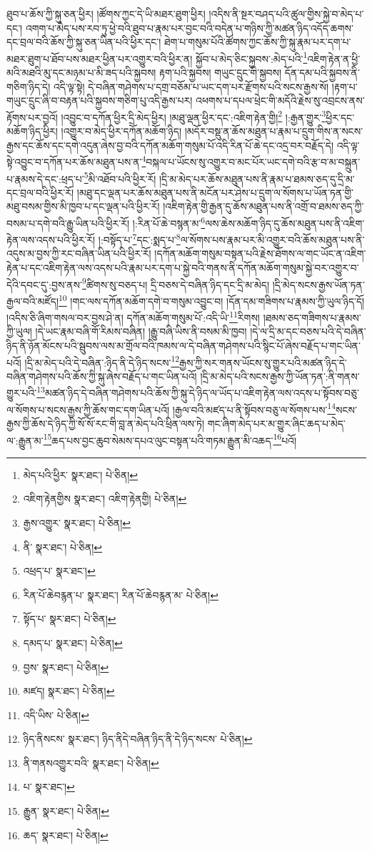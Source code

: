 ཐུབ་པ་ཆོས་ཀྱི་སྐུ་ཅན་ཕྱིར། །ཚོགས་ཀྱང་དེ་ཡི་མཐར་ཐུག་ཕྱིར། །འདིས་ནི་སྔར་བཤད་པའི་ཚུལ་གྱིས་སྐྱེ་བ་མེད་པ་དང་། འགག་པ་མེད་པས་རབ་ཏུ་ཕྱེ་བའི་ཐུབ་པ་རྣམ་པར་བྱང་བའི་བདེན་པ་གཉིས་ཀྱི་མཚན་ཉིད་འདོད་ཆགས་དང་བྲལ་བའི་ཆོས་ཀྱི་སྐུ་ཅན་ཡིན་པའི་ཕྱིར་དང་། ཐེག་པ་གསུམ་པོའི་ཚོགས་ཀྱང་ཆོས་ཀྱི་སྐུ་རྣམ་པར་དག་པ་མཐར་ཐུག་པ་ཐོབ་པས་མཐར་ཕྱིན་པར་འགྱུར་བའི་ཕྱིར་ན། སྐྱོབ་པ་མེད་ཅིང་སྐྱབས་:མེད་པའི་\footnote{མེད་པའི་ཕྱིར་  སྣར་ཐང་།  པེ་ཅིན། }འཇིག་རྟེན་ན་ཕྱི་མའི་མཐའི་མུ་དང་མཉམ་པ་མི་ཟད་པའི་སྐྱབས། རྟག་པའི་སྐྱབས། གཡུང་དྲུང་གི་སྐྱབས། དོན་དམ་པའི་སྐྱབས་ནི་གཅིག་ཉིད་དེ། འདི་ལྟ་སྟེ། དེ་བཞིན་གཤེགས་པ་དགྲ་བཅོམ་པ་ཡང་དག་པར་རྫོགས་པའི་སངས་རྒྱས་སོ། །རྟག་པ་གཡུང་དྲུང་ཞི་བ་བརྟན་པའི་སྐྱབས་གཅིག་པུ་འདི་རྒྱས་པར། འཕགས་པ་དཔལ་ཕྲེང་གི་མདོའི་རྗེས་སུ་འབྲངས་ནས་རྟོགས་པར་བྱའོ། །འབྱུང་བ་དཀོན་ཕྱིར་དྲི་མེད་ཕྱིར། །མཐུ་ལྡན་ཕྱིར་དང་:འཇིག་རྟེན་གྱི།\footnote{འཇིག་རྟེནགྱིས  སྣར་ཐང་། འཇིག་རྟེནགྱི།  པེ་ཅིན། } །:རྒྱན་གྱུར་\footnote{རྒྱས་འགྱུར་  སྣར་ཐང་།  པེ་ཅིན། }ཕྱིར་དང་མཆོག་ཉིད་ཕྱིར། །འགྱུར་བ་མེད་ཕྱིར་དཀོན་མཆོག་ཉིད། །མདོར་བསྡུ་ན་ཆོས་མཐུན་པ་རྣམ་པ་དྲུག་གིས་ན་སངས་རྒྱས་དང་ཆོས་དང་དགེ་འདུན་ཞེས་བྱ་བའི་དཀོན་མཆོག་གསུམ་པོ་འདི་རིན་པོ་ཆེ་དང་འདྲ་བར་བརྗོད་དེ། འདི་ལྟ་སྟེ་འབྱུང་བ་དཀོན་པར་ཆོས་མཐུན་པས་ན་\footnote{ནི་  སྣར་ཐང་།  པེ་ཅིན། }བསྐལ་པ་ཡོངས་སུ་འགྱུར་བ་མང་པོར་ཡང་དགེ་བའི་རྩ་བ་མ་བསྐྲུན་པ་རྣམས་དེ་དང་:ཕྲད་པ་\footnote{འཕྲད་པ་  སྣར་ཐང་། }མི་འཐོབ་པའི་ཕྱིར་རོ། །དྲི་མ་མེད་པར་ཆོས་མཐུན་པས་ནི་རྣམ་པ་ཐམས་ཅད་དུ་དྲི་མ་དང་བྲལ་བའི་ཕྱིར་རོ། །མཐུ་དང་ལྡན་པར་ཆོས་མཐུན་པས་ནི་མངོན་པར་ཤེས་པ་དྲུག་ལ་སོགས་པ་ཡོན་ཏན་གྱི་མཐུ་བསམ་གྱིས་མི་ཁྱབ་པ་དང་ལྡན་པའི་ཕྱིར་རོ། །འཇིག་རྟེན་གྱི་རྒྱན་དུ་ཆོས་མཐུན་པས་ནི་འགྲོ་བ་ཐམས་ཅད་ཀྱི་བསམ་པ་དགེ་བའི་རྒྱུ་ཡིན་པའི་ཕྱིར་རོ། །:རིན་པོ་ཆེ་བསྙན་མ་\footnote{རིན་པོ་ཆེབརྙན་པ་  སྣར་ཐང་། རིན་པོ་ཆེབརྙན་མ་  པེ་ཅིན། }ལས་ཆེས་མཆོག་ཉིད་དུ་ཆོས་མཐུན་པས་ནི་འཇིག་རྟེན་ལས་འདས་པའི་ཕྱིར་རོ། །:བསྟོད་པ་\footnote{སྟོད་པ་  སྣར་ཐང་།  པེ་ཅིན། }དང་:སྨད་པ་\footnote{དམད་པ་  སྣར་ཐང་།  པེ་ཅིན། }ལ་སོགས་པས་རྣམ་པར་མི་འགྱུར་བའི་ཆོས་མཐུན་པས་ནི་འདུས་མ་བྱས་ཀྱི་རང་བཞིན་ཡིན་པའི་ཕྱིར་རོ། །དཀོན་མཆོག་གསུམ་བསྟན་པའི་རྗེས་ཐོགས་ལ་གང་ཡོང་ན་འཇིག་རྟེན་པ་དང་འཇིག་རྟེན་ལས་འདས་པའི་རྣམ་པར་དག་པ་སྐྱེ་བའི་གནས་ནི་དཀོན་མཆོག་གསུམ་སྐྱེ་བར་འགྱུར་བ་དེའི་དབང་དུ་:བྱས་ནས་\footnote{བྱས་  སྣར་ཐང་།  པེ་ཅིན། }ཚིགས་སུ་བཅད་པ། དྲི་བཅས་དེ་བཞིན་ཉིད་དང་དྲི་མ་མེད། །དྲི་མེད་སངས་རྒྱས་ཡོན་ཏན་རྒྱལ་བའི་མཛོད།\footnote{མཛད།  སྣར་ཐང་།  པེ་ཅིན། } །གང་ལས་དཀོན་མཆོག་དགེ་བ་གསུམ་འབྱུང་བ། །དོན་དམ་གཟིགས་པ་རྣམས་ཀྱི་ཡུལ་ཉིད་དོ། །འདིས་ཅི་ཞིག་གསལ་བར་བྱས་ཤེ་ན། དཀོན་མཆོག་གསུམ་པོ་:འདི་ཡི་\footnote{འདི་ཡིས་  པེ་ཅིན། }རིགས། །ཐམས་ཅད་གཟིགས་པ་རྣམས་ཀྱི་ཡུལ། །དེ་ཡང་རྣམ་བཞི་གོ་རིམས་བཞིན། །རྒྱུ་བཞི་ཡིས་ནི་བསམ་མི་ཁྱབ། །དེ་ལ་དྲི་མ་དང་བཅས་པའི་དེ་བཞིན་ཉིད་ནི་ཉོན་མོངས་པའི་སྦུབས་ལས་མ་གྲོལ་བའི་ཁམས་ལ་དེ་བཞིན་གཤེགས་པའི་སྙིང་པོ་ཞེས་བརྗོད་པ་གང་ཡིན་པའོ། །དྲི་མ་མེད་པའི་དེ་བཞིན་:ཉིད་ནི་དེ་ཉིད་སངས་\footnote{ཉིད་ནིསངས་  སྣར་ཐང་། ཉིད་ནིདེ་བཞིན་ཉིད་ནི་དེ་ཉིད་སངས་  པེ་ཅིན། }རྒྱས་ཀྱི་སར་གནས་ཡོངས་སུ་གྱུར་པའི་མཚན་ཉིད་དེ་བཞིན་གཤེགས་པའི་ཆོས་ཀྱི་སྐུ་ཞེས་བརྗོད་པ་གང་ཡིན་པའོ། །དྲི་མ་མེད་པའི་སངས་རྒྱས་ཀྱི་ཡོན་ཏན་:ནི་གནས་གྱུར་པའི་\footnote{ནི་གནསའགྱུར་བའི་  སྣར་ཐང་།  པེ་ཅིན། }མཚན་ཉིད་དེ་བཞིན་གཤེགས་པའི་ཆོས་ཀྱི་སྐུ་དེ་ཉིད་ལ་ཡོད་པ་འཇིག་རྟེན་ལས་འདས་པ་སྟོབས་བཅུ་ལ་སོགས་པ་སངས་རྒྱས་ཀྱི་ཆོས་གང་དག་ཡིན་པའོ། །རྒྱལ་བའི་མཛད་པ་ནི་སྟོབས་བཅུ་ལ་སོགས་པས་\footnote{པ་  སྣར་ཐང་། }སངས་རྒྱས་ཀྱི་ཆོས་དེ་ཉིད་ཀྱི་སོ་སོ་རང་གི་བླ་ན་མེད་པའི་ཕྲིན་ལས་ཏེ། གང་ཞིག་མེད་པར་མ་གྱུར་ཞིང་ཆད་པ་མེད་ལ་:རྒྱུན་མ་\footnote{རྒྱུན་  སྣར་ཐང་།  པེ་ཅིན། }ཆད་པས་བྱང་ཆུབ་སེམས་དཔའ་ལུང་བསྟན་པའི་གཏམ་རྒྱུན་མི་འཆད་\footnote{ཆད་  སྣར་ཐང་།  པེ་ཅིན། }པའོ། 